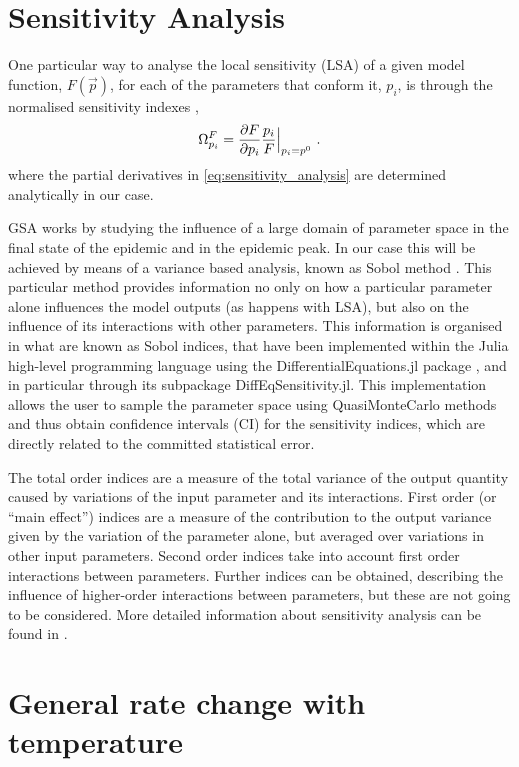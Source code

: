 \section{Sensitivity Analysis} \label{app:sensanal}

One particular way to analyse the local sensitivity (LSA) of a given model
function, $F(\vec{p})$, for each of the parameters that conform it, $p_i$, is
through the normalised sensitivity indexes \cite{sensitivity_analysis},
\begin{equation}\label{eq:sensitivity_analysis}
    \Omega_{p_i}^{F}=\frac{\partial F}{\partial p_i}\frac{p_i}{F}\Big|_{p_i=p^0}^{} \
    .
\end{equation}
where the partial derivatives in \cref{eq:sensitivity_analysis} are
determined analytically in our case.

GSA works by studying the influence of a large domain of parameter space in
the final state of the epidemic and in the epidemic peak.
In our case this will be achieved by means of a variance based analysis,
known as Sobol method \cite{SOBOL2001271}. This particular method provides
information no only on how a particular parameter alone influences the model
outputs (as happens with LSA), but also on the influence of its interactions
with other parameters. This information is organised in what are known as Sobol
indices, that have been
implemented within the Julia high-level programming language \cite{julia}
using the DifferentialEquations.jl package \cite{DifferentialEquations.jl},
and in particular through its subpackage DiffEqSensitivity.jl. This
implementation allows the user to sample the parameter space using
QuasiMonteCarlo methods and thus obtain confidence intervals (CI) for the
sensitivity indices, which are directly related to the committed statistical
error.

The total order indices are a measure of the total variance of the output
quantity caused by variations of the input parameter and its interactions.
First order (or ``main effect'') indices are a measure of the contribution to
the output variance given by the variation of the parameter alone, but averaged
over variations in other input parameters. Second order indices take into
account first order interactions between parameters. Further indices can be
obtained, describing the influence of higher-order interactions between
parameters, but these are not going to be considered.
More detailed information about sensitivity analysis can be found in
\cite{Sensitivity_analysis_book}.

\section{General rate change with temperature} \label{app:rate_change}

